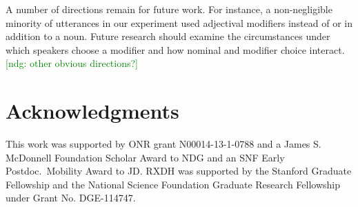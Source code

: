 \documentclass[10pt,letterpaper]{article}
\newcommand{\jd}[1]{\textcolor{Blue}{[jd: #1]}}
\newcommand{\ndg}[1]{\textcolor{Green}{[ndg: #1]}}
\begin{document}
A number of directions remain for future work.
For instance, a non-negligible minority of utterances in our experiment used adjectival modifiers instead of or in addition to a noun. 
Future research should examine the circumstances under which speakers choose a modifier and how nominal and modifier choice interact.
\ndg{other obvious directions?}

%

\section{\bf Acknowledgments}

This work was supported by ONR grant N00014-13-1-0788 and a James S. McDonnell Foundation Scholar Award to NDG and an SNF Early Postdoc.~Mobility Award to JD. RXDH was supported by the Stanford Graduate Fellowship and the National Science Foundation Graduate Research Fellowship under Grant No. DGE-114747.

\small




\setlength{\bibleftmargin}{.125in}
\setlength{\bibindent}{-\bibleftmargin}


\end{document}
